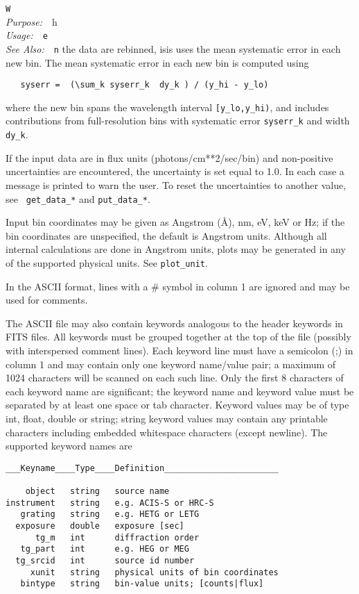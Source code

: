 \documentclass{book}
\makeatletter
\newif\ifpdf
\newenvironment{isisfunction}[4]%
{\index{{#1}@{\tt #1}}%
  \ifpdf
  \else
     \addcontentsline{toc}{subsection}{{#1} -- {#2}}
  \fi
  \vbox{
          \vspace*{\baselineskip}
          {\LARGE\tt #1}\vspace*{\baselineskip}\\
          {{\it Purpose:}~~{#2}}\\
          {{\it Usage:}~~{\tt #3}}\\
          {{\it See Also:}~~{\tt #4}}
       }
}%
{ }
\makeatother
\begin{document}
\begin{isisfunction}
When the data are rebinned, isis uses the mean systematic error
in each new bin.  The mean systematic error in each new bin is
computed using
\begin{verbatim}
   syserr =  (\sum_k syserr_k  dy_k ) / (y_hi - y_lo)
\end{verbatim}
where the new bin spans the wavelength interval
\verb|[y_lo,y_hi)|, and includes contributions from
full-resolution bins with systematic error \verb|syserr_k| and
width \verb|dy_k|.

If the input data are in flux units (photons/cm**2/sec/bin) and
non-positive uncertainties are encountered, the uncertainty is
set equal to 1.0. In each case a message is printed to warn the
user.  To reset the uncertainties to another value, see {\tt
get\_data\_*} and {\tt put\_data\_*}.

Input bin coordinates may be given as Angstrom (\AA), nm, eV, keV or
Hz; if the bin coordinates are unspecified, the default is Angstrom
units. Although all internal calculations are done in Angstrom units,
plots may be generated in any of the supported physical units. See
{\tt plot\_unit}.

In the ASCII format, lines with a \# symbol in column 1 are ignored
and may be used for comments.

The ASCII file may also contain keywords analogous to the header
keywords in FITS files.  All keywords must be grouped together at the
top of the file (possibly with interspersed comment lines).  Each
keyword line must have a semicolon (;) in column 1 and may contain
only one keyword name/value pair; a maximum of 1024 characters will be
scanned on each such line. Only the first 8 characters of each keyword
name are significant; the keyword name and keyword value must be
separated by at least one space or tab character. Keyword values may
be of type int, float, double or string; string keyword values may
contain any printable characters including embedded whitespace
characters (except newline). The supported keyword names are

\begin{verbatim}
___Keyname____Type____Definition_______________________

    object   string   source name
instrument   string   e.g. ACIS-S or HRC-S
   grating   string   e.g. HETG or LETG
  exposure   double   exposure [sec]
      tg_m   int      diffraction order
   tg_part   int      e.g. HEG or MEG
  tg_srcid   int      source id number
     xunit   string   physical units of bin coordinates
   bintype   string   bin-value units; [counts|flux]
\end{verbatim}


\end{isisfunction}
\end{document}
